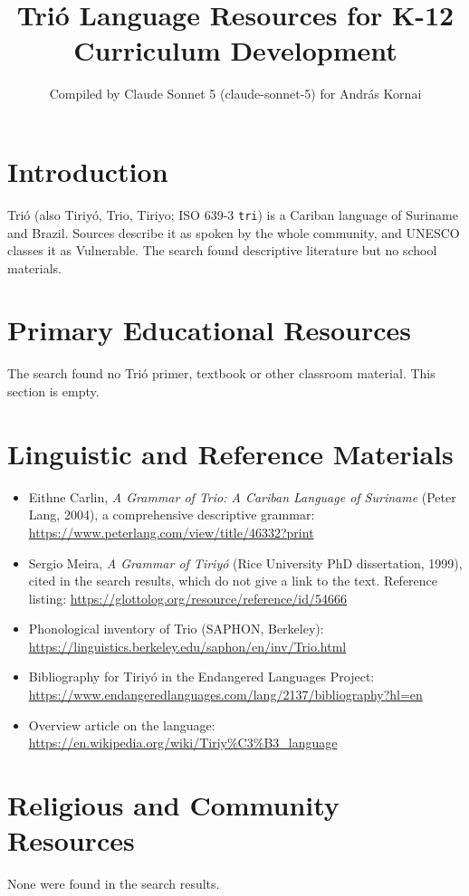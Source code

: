 \documentclass[12pt]{article}
\title{Tri\'o Language Resources for K-12 Curriculum Development}
\author{Compiled by Claude Sonnet 5 (claude-sonnet-5) for Andr\'as Kornai}
\date{}
\begin{document}
\maketitle

\section{Introduction}
Tri\'o (also Tiriy\'o, Trio, Tiriyo; ISO 639-3 \texttt{tri}) is a Cariban language of Suriname and Brazil. Sources describe it as spoken by the whole community, and UNESCO classes it as Vulnerable. The search found descriptive literature but no school materials.

\section{Primary Educational Resources}
The search found no Tri\'o primer, textbook or other classroom material. This section is empty.

\section{Linguistic and Reference Materials}
\begin{itemize}
\item Eithne Carlin, \emph{A Grammar of Trio: A Cariban Language of Suriname} (Peter Lang, 2004), a comprehensive descriptive grammar: \url{https://www.peterlang.com/view/title/46332?print}
\item Sergio Meira, \emph{A Grammar of Tiriy\'o} (Rice University PhD dissertation, 1999), cited in the search results, which do not give a link to the text. Reference listing: \url{https://glottolog.org/resource/reference/id/54666}
\item Phonological inventory of Trio (SAPHON, Berkeley): \url{https://linguistics.berkeley.edu/saphon/en/inv/Trio.html}
\item Bibliography for Tiriy\'o in the Endangered Languages Project: \url{https://www.endangeredlanguages.com/lang/2137/bibliography?hl=en}
\item Overview article on the language: \url{https://en.wikipedia.org/wiki/Tiriy%C3%B3_language}
\end{itemize}

\section{Religious and Community Resources}
None were found in the search results.
\end{document}
